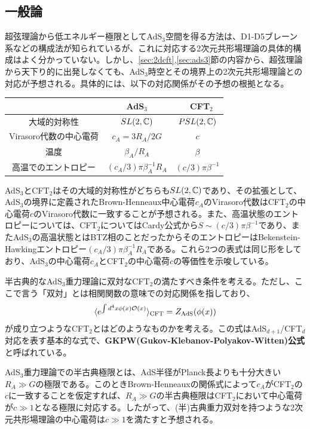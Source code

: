 \subsection{一般論}
超弦理論から低エネルギー極限としてAdS$_3$空間を得る方法は、D1-D5ブレーン系などの構成法が知られているが、これに対応する2次元共形場理論の具体的構成はよく分かっていない。しかし、\ref{sec:2dcft},\ref{sec:ads3}節の内容から、超弦理論から天下り的に出発しなくても、AdS$_3$時空とその境界上の2次元共形場理論との対応が予想される。具体的には、以下の対応関係がその予想の根拠となる。
\begin{table}[H]
	\centering
	\begin{tabular}{|c|c|c|}\hline
		 & AdS$_3$ &　CFT$_2$ \\ \hline
		大域的対称性 & $SL(2,\mathbb{C})$ & $PSL(2,\mathbb{C})$\\\hline
		Virasoro代数の中心電荷 & $c_A=3R_A/2G$ & $c$ \\\hline
		温度 & $\beta_A/R_A$ & $\beta$ \\\hline
		高温でのエントロピー & $(c_A/3)\pi\beta_A^{-1} R_A$ & $(c/3)\pi\beta^{-1}$ \\ \hline
	\end{tabular}
\end{table}
AdS$_3$とCFT$_2$はその大域的対称性がどちらも$SL(2,\mathbb{C})$であり、その拡張として、AdS$_3$の境界に定義されたBrown-Henneaux中心電荷$c_A$のVirasoro代数はCFT$_2$の中心電荷$c$のVirasoro代数に一致することが予想される。また、高温状態のエントロピーについては、CFT$_2$についてはCardy公式から$S\sim (c/3)\pi\beta^{-1}$であり、またAdS$_3$の高温状態とはBTZ相のことだったからそのエントロピーはBekenstein-Hawkingエントロピー$(c_A/3)\pi\beta_A^{-1} R_A$である。これら2つの表式は同じ形をしており、AdS$_3$の中心電荷$c_A$とCFT$_2$の中心電荷$c$の等価性を示唆している。

半古典的なAdS$_3$重力理論に双対なCFT$_2$の満たすべき条件を考える。ただし、ここで言う「双対」とは相関関数の意味での対応関係を指しており、
\begin{align}
\langle e^{\int d^4x \phi(x) \mathcal{O}(x)} \rangle_\text{CFT}=Z_\text{AdS}(\phi(x))
\end{align}
が成り立つようなCFT$_2$とはどのようなものかを考える。この式はAdS$_{d+1}$/CFT$_d$対応を表す基本的な式で、\textbf{GKPW(Gukov-Klebanov-Polyakov-Witten)公式}\cite{Gubser_1998}\cite{Witten:1998qj}と呼ばれている。

AdS$_3$重力理論での半古典極限とは、AdS半径がPlanck長よりも十分大きい$R_A\gg G$の極限である。このときBrown-Henneauxの関係式によって$c_A$がCFT$_2$の$c$に一致することを仮定すれば、$R_A\gg G$の半古典極限はCFT$_2$において中心電荷が$c\gg 1$となる極限に対応する。したがって、(半)古典重力双対を持つような2次元共形場理論の中心電荷は$c\gg 1$を満たすと予想される。


